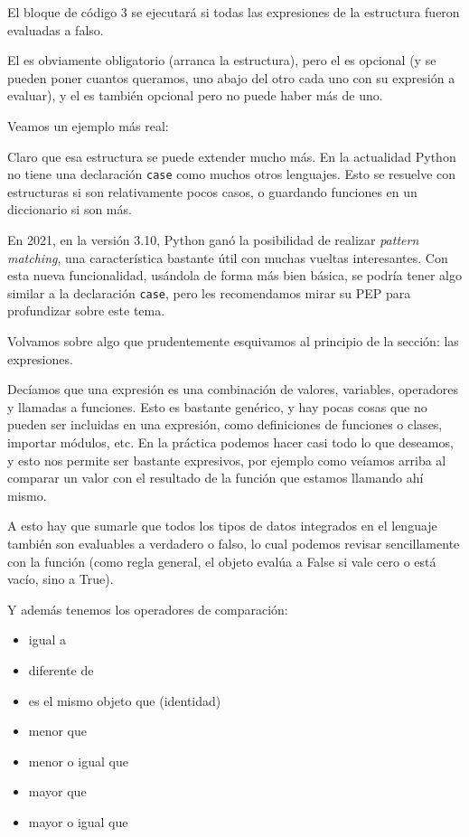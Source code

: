 El bloque de código 3 se ejecutará si todas las expresiones de la estructura fueron evaluadas a falso.

El  es obviamente obligatorio (arranca la estructura), pero el  es opcional (y se pueden poner cuantos queramos, uno abajo del otro cada uno con su expresión a evaluar), y el  es también opcional pero no puede haber más de uno.

Veamos un ejemplo más real:


Claro que esa estructura se puede extender mucho más. En la actualidad Python no tiene una declaración \texttt{case} como muchos otros lenguajes. Esto se resuelve con estructuras  si son relativamente pocos casos, o guardando funciones en un diccionario si son más.

En 2021, en la versión 3.10, Python ganó la posibilidad de realizar \textit{pattern matching}, una característica bastante útil con muchas vueltas interesantes. Con esta nueva funcionalidad, usándola de forma más bien básica, se podría tener algo similar a la declaración \texttt{case}, pero les recomendamos mirar su PEP \cite{pep-0622} para profundizar sobre este tema.

Volvamos sobre algo que prudentemente esquivamos al principio de la sección: las expresiones.

Decíamos que una expresión es una combinación de valores, variables, operadores y llamadas a funciones. Esto es bastante genérico, y hay pocas cosas que no pueden ser incluidas en una expresión, como definiciones de funciones o clases, importar módulos, etc. En la práctica podemos hacer casi todo lo que deseamos, y esto nos permite ser bastante expresivos, por ejemplo como veíamos arriba al comparar un valor con el resultado de la función  que estamos llamando ahí mismo.

A esto hay que sumarle que todos los tipos de datos integrados en el lenguaje también son evaluables a verdadero o falso, lo cual podemos revisar sencillamente con la función  (como regla general, el objeto evalúa a False si vale cero o está vacío, sino a True).


Y además tenemos los operadores de comparación:

\begin{itemize}
\item \mip{==} igual a
\item \mip{!=} diferente de
\item {} es el mismo objeto que (identidad)
\item \mip{<} menor que
\item \mip{<=} menor o igual que
\item \mip{>} mayor que
\item \mip{>=} mayor o igual que
\end{itemize}

